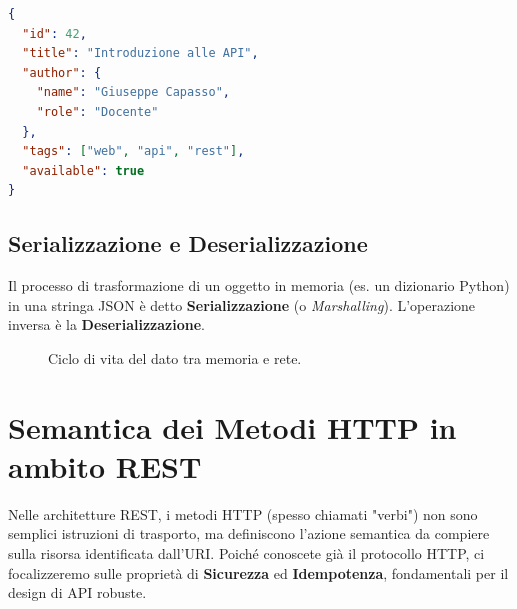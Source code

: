\documentclass[11pt,a4paper]{report}
\begin{document}
\begin{lstlisting}[language=json, caption=Esempio di risorsa rappresentata in JSON]
{
  "id": 42,
  "title": "Introduzione alle API",
  "author": {
    "name": "Giuseppe Capasso",
    "role": "Docente"
  },
  "tags": ["web", "api", "rest"],
  "available": true
}
\end{lstlisting}

\subsection{Serializzazione e Deserializzazione}
Il processo di trasformazione di un oggetto in memoria (es. un dizionario Python) in una stringa JSON è detto \textbf{Serializzazione} (o \textit{Marshalling}). L'operazione inversa è la \textbf{Deserializzazione}.

\begin{figure}[ht]
\centering
{}
\caption{Ciclo di vita del dato tra memoria e rete.}
\label{fig:serialization}
\end{figure}

\section{Semantica dei Metodi HTTP in ambito REST}
Nelle architetture REST, i metodi HTTP (spesso chiamati "verbi") non sono semplici istruzioni di trasporto, ma definiscono l'azione semantica da compiere sulla risorsa identificata dall'URI. Poich\'e conoscete già il protocollo HTTP, ci focalizzeremo sulle proprietà di \textbf{Sicurezza} ed \textbf{Idempotenza}, fondamentali per il design di API robuste.
\end{document}
